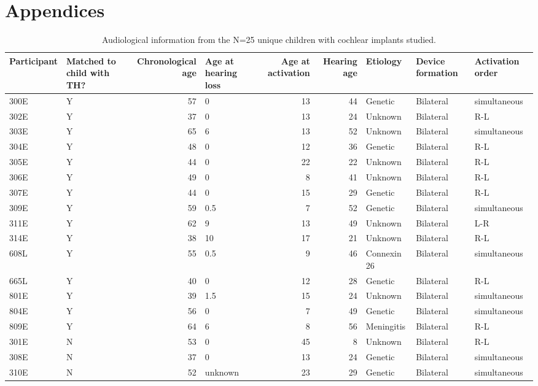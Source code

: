 \documentclass[
]{article}
\begin{document}
\hypertarget{appendices}{%
\section{Appendices}\label{appendices}}

\begin{table}[!h]

\caption{\label{tab:audiological-info}Audiological information from the N=25 unique children with cochlear implants studied.}
\centering
\begin{tabular}[t]{llrlrrlll}
\toprule
Participant & Matched to child with TH? & Chronological age & Age at hearing loss & Age at activation & Hearing age & Etiology & Device formation & Activation order\\
\midrule
300E & Y & 57 & 0 & 13 & 44 & Genetic & Bilateral & simultaneous\\
302E & Y & 37 & 0 & 13 & 24 & Unknown & Bilateral & R-L\\
303E & Y & 65 & 6 & 13 & 52 & Unknown & Bilateral & simultaneous\\
304E & Y & 48 & 0 & 12 & 36 & Genetic & Bilateral & R-L\\
305E & Y & 44 & 0 & 22 & 22 & Unknown & Bilateral & R-L\\
\addlinespace
306E & Y & 49 & 0 & 8 & 41 & Unknown & Bilateral & R-L\\
307E & Y & 44 & 0 & 15 & 29 & Genetic & Bilateral & R-L\\
309E & Y & 59 & 0.5 & 7 & 52 & Genetic & Bilateral & simultaneous\\
311E & Y & 62 & 9 & 13 & 49 & Unknown & Bilateral & L-R\\
314E & Y & 38 & 10 & 17 & 21 & Unknown & Bilateral & R-L\\
\addlinespace
608L & Y & 55 & 0.5 & 9 & 46 & Connexin 26 & Bilateral & simultaneous\\
665L & Y & 40 & 0 & 12 & 28 & Genetic & Bilateral & R-L\\
801E & Y & 39 & 1.5 & 15 & 24 & Unknown & Bilateral & simultaneous\\
804E & Y & 56 & 0 & 7 & 49 & Genetic & Bilateral & simultaneous\\
809E & Y & 64 & 6 & 8 & 56 & Meningitis & Bilateral & R-L\\
\addlinespace
301E & N & 53 & 0 & 45 & 8 & Unknown & Bilateral & R-L\\
308E & N & 37 & 0 & 13 & 24 & Genetic & Bilateral & simultaneous\\
310E & N & 52 & unknown & 23 & 29 & Genetic & Bilateral & simultaneous\\

\end{tabular}
\end{table}
\end{document}
